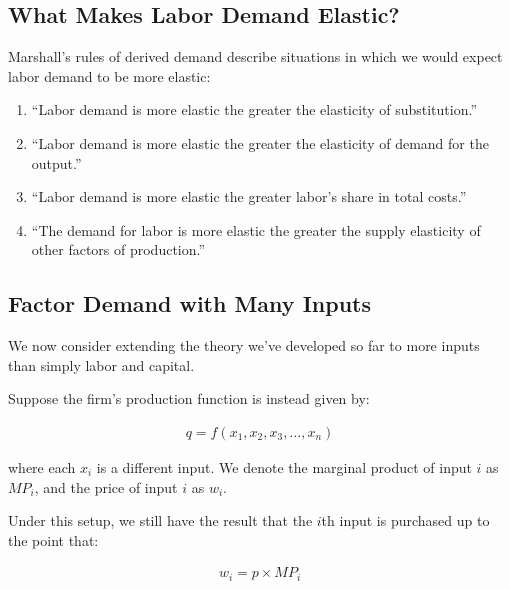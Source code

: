\subsection{What Makes Labor Demand Elastic?}


Marshall's rules of derived demand 
describe situations in which we would 
expect labor demand to be more elastic: 

\begin{enumerate}
    \item ``Labor demand is more elastic the greater the elasticity of substitution.''
    \item ``Labor demand is more elastic the greater the elasticity of demand for the output.''
    \item ``Labor demand is more elastic the greater labor's share in total costs.''
    \item ``The demand for labor is more elastic the greater the supply elasticity of other factors of production.''
\end{enumerate}


\subsection{Factor Demand with Many Inputs}

We now consider
extending the theory we've developed so far 
to more inputs than simply labor and capital.

Suppose the firm's production function 
is instead given by:

\begin{align}
    q=f\left(x_1, x_2, x_3, \ldots, x_n\right)
\end{align}

where each $x_i$ is a different input.
We denote the marginal product of input $i$ as $MP_i$,
and the price of input $i$ as $w_i$.

Under this setup, we still have the result that
the $i$th input is purchased up to the point that:

\begin{align}
    w_i=p \times MP_i
\end{align}

